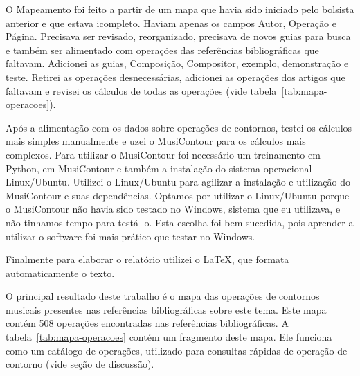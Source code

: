 \documentclass[11pt]{article}
\begin{document}
O Mapeamento foi feito a partir de um mapa que havia sido iniciado
pelo bolsista anterior e que estava icompleto.
Haviam apenas os campos Autor, Operação e Página.
Precisava ser
revisado, reorganizado, precisava de novos guias para busca e também
ser alimentado com operações das referências bibliográficas que
faltavam. Adicionei as guias, Composição, Compositor, exemplo,
demonstração e teste. Retirei as operações desnecessárias, adicionei
as operações dos artigos que faltavam e revisei os cálculos de todas
as operações (vide tabela~\ref{tab:mapa-operacoes}).

Após a alimentação com os dados sobre operações de contornos,
testei os cálculos mais simples manualmente e
uzei o MusiContour para
os cálculos mais complexos.
Para utilizar o MusiContour foi necessário um
treinamento em Python, em MusiContour e também a instalação do sistema
operacional Linux/Ubuntu. Utilizei o Linux/Ubuntu para agilizar a
instalação e utilização do MusiContour e suas dependências.
Optamos por utilizar o Linux/Ubuntu porque o MusiContour não havia
sido testado no Windows, sistema que eu utilizava, e não tinhamos tempo
para testá-lo. Esta escolha foi bem sucedida, pois aprender
a utilizar o software foi mais prático que testar no Windows.


Finalmente para elaborar o relatório utilizei o \LaTeX, que formata
automaticamente o texto.

\label{sec:resultados}


O principal resultado deste trabalho é o mapa das operações de
contornos musicais presentes nas referências bibliográficas sobre este
tema. Este mapa contém 508 operações encontradas nas referências
bibliográficas. A tabela~\ref{tab:mapa-operacoes} contém um fragmento
deste mapa. Ele funciona como um catálogo de operações, utilizado para
consultas rápidas de operação de contorno (vide seção de discussão).
\end{document}
